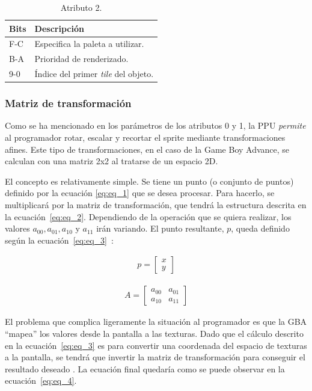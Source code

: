 \begin{table}[h]
	\centering
	\begin{tabular}{| l | l |}
		\hline
		\textbf{Bits} & \textbf{Descripción} \\ \hline
		F-C & Especifica la paleta a utilizar. \\ \hline
		B-A & Prioridad de renderizado. \\ \hline
		9-0 & Índice del primer \textit{tile} del objeto. \\ \hline
	\end{tabular}
	\caption{Atributo 2.}
	\label{tab:sprite_attr2}
\end{table}


\subsubsection{Matriz de transformación}\label{sec:aff_obj}
Como se ha mencionado en los parámetros de los atributos 0 y 1, la PPU \textit{permite} al programador rotar, escalar y recortar el sprite mediante transformaciones afines. Este tipo de transformaciones, en el caso de la Game Boy Advance, se calculan con una matriz 2x2 al tratarse de un espacio 2D.

El concepto es relativamente simple. Se tiene un punto (o conjunto de puntos) definido por la ecuación \eqref{eq:eq_1} que se desea procesar. Para hacerlo, se multiplicará por la matriz de transformación, que tendrá la estructura descrita en la ecuación~\eqref{eq:eq_2}. Dependiendo de la operación que se quiera realizar, los valores $a_{00}, a_{01}, a_{10}$ y $a_{11}$ irán variando. El punto resultante, $p$, queda definido según la ecuación~\eqref{eq:eq_3}~\cite{bib:aff_matrix}:

\begin{align}
	p = 
	\begin{bmatrix}
		x\\
		y
	\end{bmatrix}
	\label{eq:eq_1}
\end{align}

\begin{align}
	A = 
	\begin{bmatrix}
		a_{00} & a_{01}\\
		a_{10} & a_{11}
	\end{bmatrix}
	\label{eq:eq_2}
\end{align}


El problema que complica ligeramente la situación al programador es que la GBA ``mapea'' los valores desde la pantalla a las texturas. Dado que el cálculo descrito en la ecuación~\eqref{eq:eq_3} es para convertir una coordenada del espacio de texturas a la pantalla, se tendrá que invertir la matriz de transformación para conseguir el resultado deseado \cite{bib:algebra}. La ecuación final quedaría como se puede observar en la ecuación~\eqref{eq:eq_4}.

